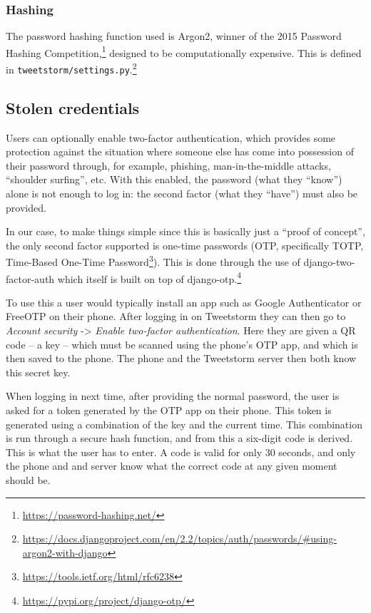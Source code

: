 \documentclass[11pt,english]{article}
\begin{document}
\subsubsection{Hashing}

The password hashing function used is Argon2, winner of the 2015 Password Hashing Competition,\footnote{\url{https://password-hashing.net/}} designed to be computationally expensive. This is defined in \lstinline{tweetstorm/settings.py}.\footnote{\url{https://docs.djangoproject.com/en/2.2/topics/auth/passwords/\#using-argon2-with-django}}

\subsection{Stolen credentials}

Users can optionally enable two-factor authentication, which provides some protection against the situation where someone else has come into possession of their password through, for example, phishing, man-in-the-middle attacks, “shoulder surfing”, etc. With this enabled, the password (what they “know”) alone is not enough to log in: the second factor (what they “have”) must also be provided.

In our case, to make things simple since this is basically just a “proof of concept”, the only second factor supported is one-time passwords (OTP, specifically TOTP, Time-Based One-Time Password\footnote{\url{https://tools.ietf.org/html/rfc6238}}). This is done through the use of django-two-factor-auth which itself is built on top of django-otp.\footnote{\url{https://pypi.org/project/django-otp/}}

To use this a user would typically install an app such as Google Authenticator or FreeOTP on their phone. After logging in on Tweetstorm they can then go to \emph{Account security} -> \emph{Enable two-factor authentication}. Here they are given a QR code -- a key -- which must be scanned using the phone’s OTP app, and which is then saved to the phone. The phone and the Tweetstorm server then both know this secret key.

When logging in next time, after providing the normal password, the user is asked for a token generated by the OTP app on their phone. This token is generated using a combination of the key and the current time. This combination is run through a secure hash function, and from this a six-digit code is derived. This is what the user has to enter. A code is valid for only 30 seconds, and only the phone and and server know what the correct code at any given moment should be.
\end{document}

